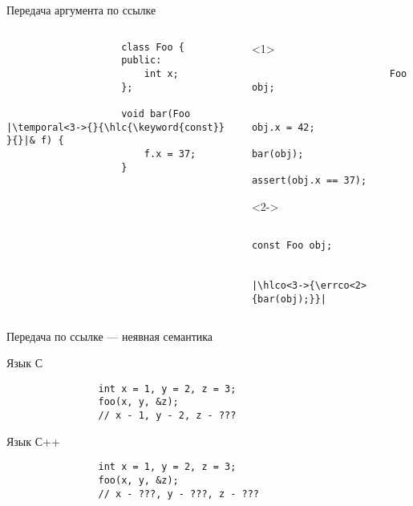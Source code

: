 \documentclass[aspectratio=169,14pt]{beamer}
\begin{document}
    \begin{frame}[fragile]{Передача аргумента по ссылке}
        \begin{columns}[T]
            \begin{column}{0.4\textwidth}
                \begin{verbatim}
                    class Foo {
                    public:
                        int x;
                    };

                    void bar(Foo |\temporal<3->{}{\hlc{\keyword{const}} }{}|& f) {
                        f.x = 37;
                    }
                \end{verbatim}
            \end{column}
            \begin{column}{0.6\textwidth}
                \begin{onlyenv}<1>
                    \begin{verbatim}
                        Foo obj;

                        obj.x = 42;
                        bar(obj);
                        assert(obj.x == 37);
                    \end{verbatim}
                \end{onlyenv}
                \begin{onlyenv}<2->
                    \begin{verbatim}
                        const Foo obj;

                        |\hlco<3->{\errco<2>{bar(obj);}}|
                    \end{verbatim}
                \end{onlyenv}
            \end{column}
        \end{columns}
    \end{frame}

    \begin{frame}[fragile]{Передача по ссылке --- неявная семантика}
        \begin{block}{Язык С}
            \begin{verbatim}
                int x = 1, y = 2, z = 3;
                foo(x, y, &z);
                // x - 1, y - 2, z - ???
            \end{verbatim}
        \end{block}

        \begin{block}{Язык С++}
            \begin{verbatim}
                int x = 1, y = 2, z = 3;
                foo(x, y, &z);
                // x - ???, y - ???, z - ???
            \end{verbatim}
        \end{block}
    \end{frame}
\end{document}
